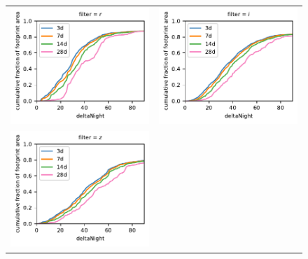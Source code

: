 \documentclass[preprintm,linenumbers]{aastex631}
\begin{document}
\begin{figure}
\begin{tabular}{@{}c@{}c@{}}
	\includegraphics{results/first_year_one_snap_v4_0_10yrs_db_noDD_noTwi_doAllTemplateMetrics_reduceDeltaNight_r.pdf} &
	\includegraphics{results/first_year_one_snap_v4_0_10yrs_db_noDD_noTwi_doAllTemplateMetrics_reduceDeltaNight_i.pdf} \\
	\includegraphics{results/first_year_one_snap_v4_0_10yrs_db_noDD_noTwi_doAllTemplateMetrics_reduceDeltaNight_z.pdf} &

\end{tabular}
\end{figure}
\end{document}
